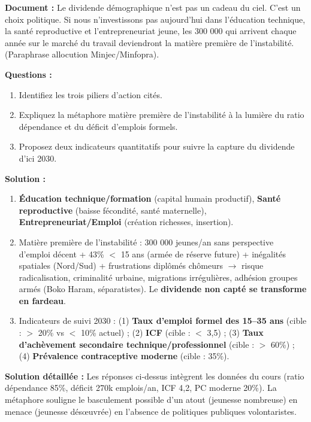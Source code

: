 \documentclass[11pt]{article}
\begin{document}
\begin{exoresolu}
\textbf{Document :} \og Le dividende démographique n'est pas un cadeau du ciel. C'est un choix politique. Si nous n'investissons pas aujourd'hui dans l'éducation technique, la santé reproductive et l'entrepreneuriat jeune, les 300 000 qui arrivent chaque année sur le marché du travail deviendront la matière première de l'instabilité. \fg{} (Paraphrase allocution Minjec/Minfopra).

\textbf{Questions :}
\begin{enumerate}
    \item Identifiez les trois piliers d'action cités.
    \item Expliquez la métaphore \og matière première de l'instabilité \fg{} à la lumière du ratio dépendance et du déficit d'emplois formels.
    \item Proposez deux indicateurs quantitatifs pour suivre la \og capture du dividende \fg{} d'ici 2030.
\end{enumerate}

\textbf{Solution :}
\begin{enumerate}
    \item \textbf{Éducation technique/formation} (capital humain productif), \textbf{Santé reproductive} (baisse fécondité, santé maternelle), \textbf{Entrepreneuriat/Emploi} (création richesses, insertion).
    \item \og Matière première de l'instabilité \fg{} : 300 000 jeunes/an sans perspective d'emploi décent + 43\% $<$ 15 ans (armée de réserve future) + inégalités spatiales (Nord/Sud) + frustrations diplômés chômeurs $\to$ risque radicalisation, criminalité urbaine, migrations irrégulières, adhésion groupes armés (Boko Haram, séparatistes). Le \textbf{dividende non capté se transforme en fardeau}.
    \item Indicateurs de suivi 2030 : (1) \textbf{Taux d'emploi formel des 15--35 ans} (cible : $>$ 20\% vs $<$ 10\% actuel) ; (2) \textbf{ICF} (cible : $<$ 3,5) ; (3) \textbf{Taux d'achèvement secondaire technique/professionnel} (cible : $>$ 60\%) ; (4) \textbf{Prévalence contraceptive moderne} (cible : 35\%).
\end{enumerate}
\tcblower
\textbf{Solution détaillée :} Les réponses ci-dessus intègrent les données du cours (ratio dépendance 85\%, déficit 270k emplois/an, ICF 4,2, PC moderne 20\%). La métaphore souligne le basculement possible d'un atout (jeunesse nombreuse) en menace (jeunesse désœuvrée) en l'absence de politiques publiques volontaristes.
\end{exoresolu}
\end{document}
